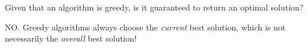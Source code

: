 Given that an algorithm is greedy, is it guaranteed to return an optimal solution?

\begin{answer}
NO.  Greedy algorithms always choose the \textit{current} best solution,
which is not necessarily the \textit{overall} best solution!
\end{answer}